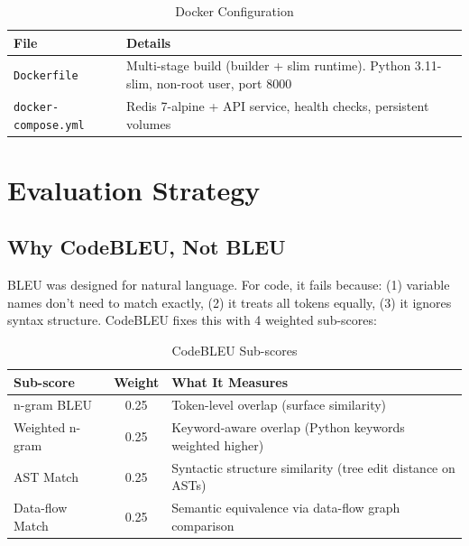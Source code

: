 \documentclass[11pt,a4paper]{article}
\begin{document}
\begin{table}[H]
\centering
\caption{Docker Configuration}
\renewcommand{\arraystretch}{1.3}
\small
\begin{tabularx}{\textwidth}{@{} l X @{}}
\toprule
\textbf{File} & \textbf{Details} \\
\midrule
\texttt{Dockerfile} & Multi-stage build (builder + slim runtime). Python 3.11-slim, non-root user, port 8000 \\
\texttt{docker-compose.yml} & Redis 7-alpine + API service, health checks, persistent volumes \\
\bottomrule
\end{tabularx}
\end{table}


\section{Evaluation Strategy}

\subsection{Why CodeBLEU, Not BLEU}

\begin{infobox}
BLEU was designed for natural language. For code, it fails because: (1) variable names don't need to match exactly, (2) it treats all tokens equally, (3) it ignores syntax structure. CodeBLEU fixes this with 4 weighted sub-scores:
\end{infobox}

\begin{table}[H]
\centering
\caption{CodeBLEU Sub-scores}
\renewcommand{\arraystretch}{1.25}
\begin{tabularx}{\textwidth}{@{} l c X @{}}
\toprule
\textbf{Sub-score} & \textbf{Weight} & \textbf{What It Measures} \\
\midrule
n-gram BLEU & 0.25 & Token-level overlap (surface similarity) \\
Weighted n-gram & 0.25 & Keyword-aware overlap (Python keywords weighted higher) \\
AST Match & 0.25 & Syntactic structure similarity (tree edit distance on ASTs) \\
Data-flow Match & 0.25 & Semantic equivalence via data-flow graph comparison \\
\bottomrule
\end{tabularx}
\end{table}
\end{document}
